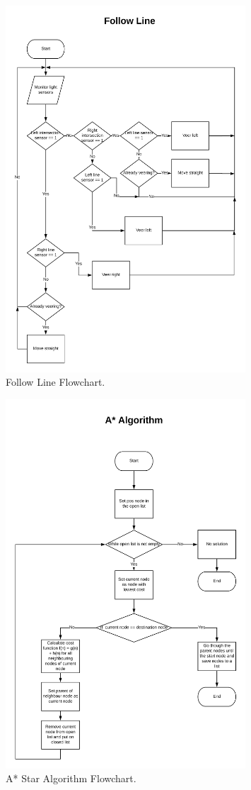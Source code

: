 \begin{figure}[H]
\centering
\includegraphics[width=0.8\textwidth]{figures/followline_flowchart.png}
\caption{Follow Line Flowchart.}
\end{figure}

\begin{figure}[H]
\centering
\includegraphics[width=0.8\textwidth]{figures/astar_flowchart.png}
\caption{A* Star Algorithm Flowchart.}
\end{figure}